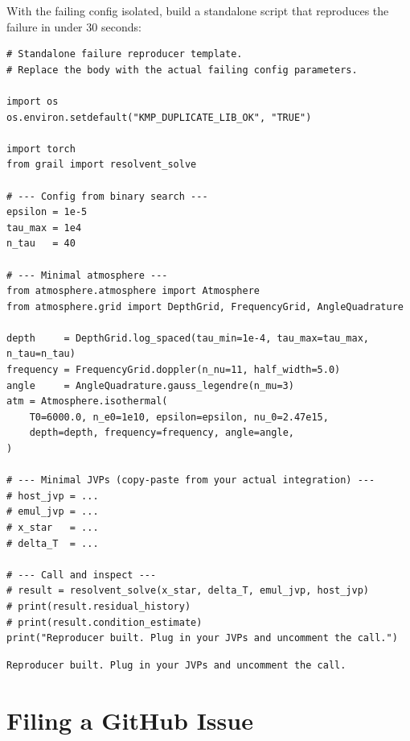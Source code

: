 \noindent With the failing config isolated, build a standalone script that
reproduces the failure in under 30 seconds:

\begin{lstlisting}[style=grailInStyle]
# Standalone failure reproducer template.
# Replace the body with the actual failing config parameters.

import os
os.environ.setdefault("KMP_DUPLICATE_LIB_OK", "TRUE")

import torch
from grail import resolvent_solve

# --- Config from binary search ---
epsilon = 1e-5
tau_max = 1e4
n_tau   = 40

# --- Minimal atmosphere ---
from atmosphere.atmosphere import Atmosphere
from atmosphere.grid import DepthGrid, FrequencyGrid, AngleQuadrature

depth     = DepthGrid.log_spaced(tau_min=1e-4, tau_max=tau_max, n_tau=n_tau)
frequency = FrequencyGrid.doppler(n_nu=11, half_width=5.0)
angle     = AngleQuadrature.gauss_legendre(n_mu=3)
atm = Atmosphere.isothermal(
    T0=6000.0, n_e0=1e10, epsilon=epsilon, nu_0=2.47e15,
    depth=depth, frequency=frequency, angle=angle,
)

# --- Minimal JVPs (copy-paste from your actual integration) ---
# host_jvp = ...
# emul_jvp = ...
# x_star   = ...
# delta_T  = ...

# --- Call and inspect ---
# result = resolvent_solve(x_star, delta_T, emul_jvp, host_jvp)
# print(result.residual_history)
# print(result.condition_estimate)
print("Reproducer built. Plug in your JVPs and uncomment the call.")
\end{lstlisting}

\begin{lstlisting}[style=grailOutStyle]
Reproducer built. Plug in your JVPs and uncomment the call.
\end{lstlisting}


\section{Filing a GitHub Issue}
\label{sec:github-issue}

